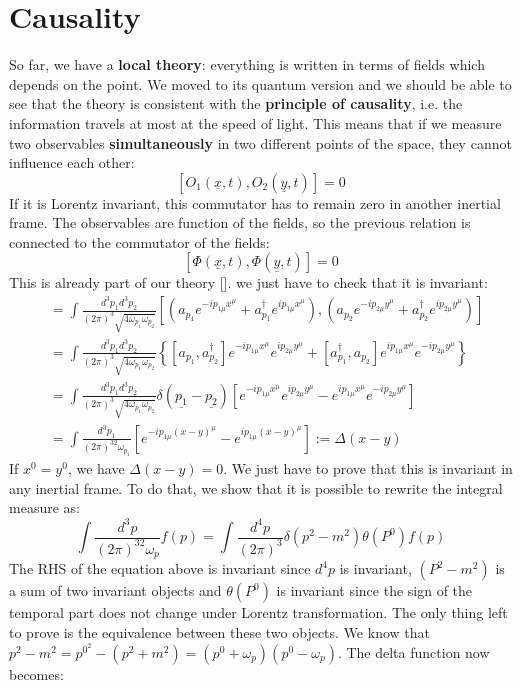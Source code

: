\documentclass[../main.tex]{subfiles}
\begin{document}
\section{Causality}
So far, we have a \textbf{local theory}: everything is written in terms of fields which depends on the point. We moved to its quantum version and we should be able to see that the theory is consistent with the \textbf{principle of causality}, i.e. the information travels at most at the speed of light. This means that if we measure two observables \textbf{simultaneously} in two different points of the space, they cannot influence each other:
\[
[O_1(\underline{x},t),O_2(\underline{y},t)]=0
\]
If it is Lorentz invariant, this commutator has to remain zero in another inertial frame. The observables are function of the fields, so the previous relation is connected to the commutator of the fields:
\[
[\Phi(\underline{x},t),\Phi(\underline{y},t)]=0
\]
This is already part of our theory []. we just have to check that it is invariant:
\begin{align*}
[\Phi(x),\Phi(y)]&=\int\frac{d^3p_1d^3p_2}{(2\pi)^3\sqrt{4\omega_{p_1}\omega_{p_2}}}\left[(a_{p_1}e^{-ip_{1\mu}x^\mu}+a^\dagger_{p_1}e^{ip_{1\mu}x^\mu}),(a_{p_2}e^{-ip_{2\mu}y^\mu}+a^\dagger_{p_2}e^{ip_{2\mu}y^\mu})\right]\\
&=\int\frac{d^3p_1d^3p_2}{(2\pi)^3\sqrt{4\omega_{p_1}\omega_{p_2}}}\left\{[a_{p_1},a^\dagger_{p_2}]e^{-ip_{1\mu}x^\mu}e^{ip_{2\mu}y^\mu}+[a_{p_1}^\dagger,a_{p_2}]e^{ip_{1\mu}x^\mu}e^{-ip_{2\mu}y^\mu}\right\}\\
&=\int\frac{d^3p_1d^3p_2}{(2\pi)^3\sqrt{4\omega_{p_1}\omega_{p_2}}}\delta(\underline{p_1}-\underline{p_2})[e^{-ip_{1\mu}x^\mu}e^{ip_{2\mu}y^\mu}-e^{ip_{1\mu}x^\mu}e^{-ip_{2\mu}y^\mu}]\\
&=\int\frac{d^3p_1}{(2\pi)^32\omega_{p_1}}[e^{-ip_{1\mu}(x-y)^\mu}-e^{ip_{1\mu}(x-y)^\mu}]:=\Delta(x-y)
\end{align*}
If $x^0=y^0$, we have $\Delta(x-y)=0$. We just have to prove that this is invariant in any inertial frame. To do that, we show that it is possible to rewrite the integral measure as:
\[
\int\frac{d^3p}{(2\pi)^32\omega_p}f(p)=\int\frac{d^4p}{(2\pi)^3}\delta(p^2-m^2)\theta(P^0)f(p)
\]
The RHS of the equation above is invariant since $d^4p$ is invariant, $(P^2-m^2)$ is a sum of two invariant objects and $\theta(P^0)$ is invariant since the sign of the temporal part does not change under Lorentz transformation. The only thing left to prove is the equivalence between these two objects. We know that $p^2-m^2=p^{0^2}-(p^2+m^2)=(p^0+\omega_p)(p^0-\omega_p)$. The delta function now becomes:
\end{document}
